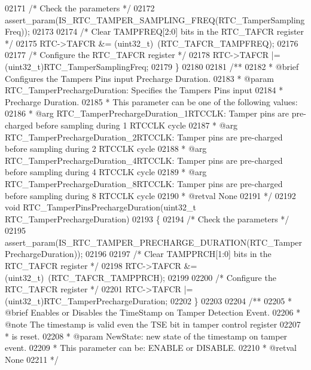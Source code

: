 \begin{DoxyCode}
02171   \textcolor{comment}{/* Check the parameters */}
02172   assert_param(IS\_RTC\_TAMPER\_SAMPLING\_FREQ(RTC\_TamperSamplingFreq));
02173 
02174   \textcolor{comment}{/* Clear TAMPFREQ[2:0] bits in the RTC\_TAFCR register */}
02175   RTC->TAFCR &= (uint32\_t)~(RTC_TAFCR_TAMPFREQ);
02176 
02177   \textcolor{comment}{/* Configure the RTC\_TAFCR register */}
02178   RTC->TAFCR |= (uint32\_t)RTC\_TamperSamplingFreq;
02179 \}
02180 
02181 \textcolor{comment}{/**}
02182 \textcolor{comment}{  * @brief  Configures the Tampers Pins input Precharge Duration.}
02183 \textcolor{comment}{  * @param  RTC\_TamperPrechargeDuration: Specifies the Tampers Pins input}
02184 \textcolor{comment}{  *         Precharge Duration.}
02185 \textcolor{comment}{  *   This parameter can be one of the following values:}
02186 \textcolor{comment}{  *     @arg RTC\_TamperPrechargeDuration\_1RTCCLK: Tamper pins are pre-charged before sampling during 1
       RTCCLK cycle}
02187 \textcolor{comment}{  *     @arg RTC\_TamperPrechargeDuration\_2RTCCLK: Tamper pins are pre-charged before sampling during 2
       RTCCLK cycle}
02188 \textcolor{comment}{  *     @arg RTC\_TamperPrechargeDuration\_4RTCCLK: Tamper pins are pre-charged before sampling during 4
       RTCCLK cycle    }
02189 \textcolor{comment}{  *     @arg RTC\_TamperPrechargeDuration\_8RTCCLK: Tamper pins are pre-charged before sampling during 8
       RTCCLK cycle}
02190 \textcolor{comment}{  * @retval None}
02191 \textcolor{comment}{  */}
02192 \textcolor{keywordtype}{void} RTC_TamperPinsPrechargeDuration(uint32\_t RTC\_TamperPrechargeDuration)
02193 \{
02194   \textcolor{comment}{/* Check the parameters */}
02195   assert_param(IS\_RTC\_TAMPER\_PRECHARGE\_DURATION(RTC\_TamperPrechargeDuration));
02196 
02197   \textcolor{comment}{/* Clear TAMPPRCH[1:0] bits in the RTC\_TAFCR register */}
02198   RTC->TAFCR &= (uint32\_t)~(RTC_TAFCR_TAMPPRCH);
02199 
02200   \textcolor{comment}{/* Configure the RTC\_TAFCR register */}
02201   RTC->TAFCR |= (uint32\_t)RTC\_TamperPrechargeDuration;
02202 \}
02203 
02204 \textcolor{comment}{/**}
02205 \textcolor{comment}{  * @brief  Enables or Disables the TimeStamp on Tamper Detection Event.}
02206 \textcolor{comment}{  * @note   The timestamp is valid even the TSE bit in tamper control register }
02207 \textcolor{comment}{  *         is reset.   }
02208 \textcolor{comment}{  * @param  NewState: new state of the timestamp on tamper event.}
02209 \textcolor{comment}{  *         This parameter can be: ENABLE or DISABLE.}
02210 \textcolor{comment}{  * @retval None}
02211 \textcolor{comment}{  */}

\end{DoxyCode}
